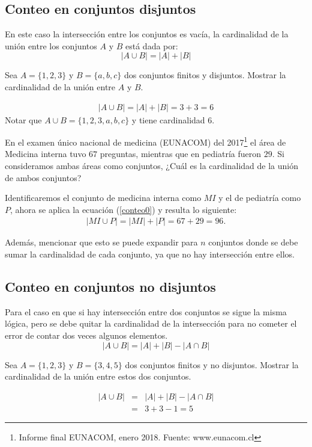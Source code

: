 \subsection{Conteo en conjuntos disjuntos}
En este caso la intersección entre los conjuntos es vacía, la cardinalidad de la unión entre los conjuntos $A$ y $B$ está dada por:
\begin{equation}
|A\cup B|=|A|+|B| \label{conteo0}
\end{equation}
\begin{myexample}
Sea $A=\{1,2,3\}$ y $B=\{a,b,c\}$ dos conjuntos finitos y disjuntos. Mostrar la cardinalidad de la unión entre $A$ y $B$.
\end{myexample}
\begin{eqnarray*}
|A\cup B|=|A|+|B|=3+3=6
\end{eqnarray*}
Notar que $A\cup B=\{1,2,3,a,b,c\}$ y tiene cardinalidad 6. 
\begin{myexample}
En el examen único nacional de medicina (EUNACOM) del 2017\footnote{Informe final EUNACOM, enero 2018. Fuente: www.eunacom.cl} el área de Medicina interna tuvo $67$ preguntas, mientras que en pediatría fueron $29$. Si consideramos ambas áreas como conjuntos, ¿Cuál es la cardinalidad de la unión de ambos conjuntos? 
\end{myexample}
Identificaremos el conjunto de medicina interna como $MI$ y el de pediatría como $P$, ahora se aplica la ecuación (\ref{conteo0}) y resulta lo siguiente:
\begin{eqnarray}
|MI\cup P|=|MI|+|P|=67+29=96.
\end{eqnarray}

Además, mencionar que esto se puede expandir para $n$ conjuntos donde se debe sumar la cardinalidad de cada conjunto, ya que no hay intersección entre ellos.

\subsection{Conteo en conjuntos no disjuntos}
Para el caso en que si hay intersección entre dos conjuntos se sigue la misma lógica, pero se debe quitar la cardinalidad de la intersección para no cometer el error de contar dos veces algunos elementos.
\begin{equation}
|A\cup B|=|A|+|B|-|A\cap B|
\end{equation}
\begin{myexample}
Sea $A=\{1,2,3\}$ y $B=\{3,4,5\}$ dos conjuntos finitos y no disjuntos. Mostrar la cardinalidad de la unión entre estos dos conjuntos.
\end{myexample}
\begin{eqnarray}
|A\cup B|&=&|A|+|B|-|A\cap B|\nonumber\\
&=& 3+3-1=5\nonumber
\end{eqnarray}

